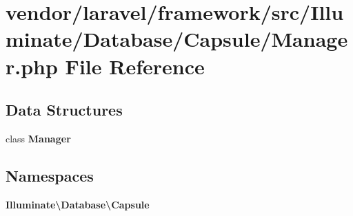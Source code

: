 \section{vendor/laravel/framework/src/\+Illuminate/\+Database/\+Capsule/\+Manager.php File Reference}
\label{_database_2_capsule_2_manager_8php}
\subsection*{Data Structures}
\begin{DoxyCompactItemize}
\item 
class {\bf Manager}
\end{DoxyCompactItemize}
\subsection*{Namespaces}
\begin{DoxyCompactItemize}
\item 
 {\bf Illuminate\textbackslash{}\+Database\textbackslash{}\+Capsule}
\end{DoxyCompactItemize}
